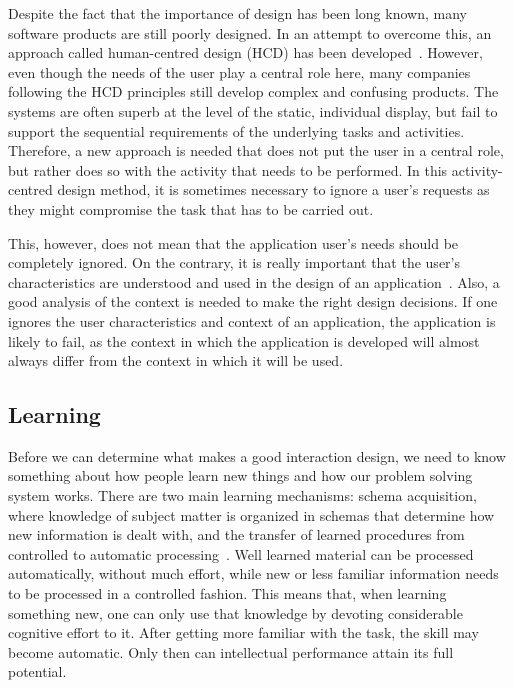Despite the fact that the importance of design has been long known, many software products are still poorly designed. In an attempt to overcome this, an approach called human-centred design (HCD) has been developed~\cite{norman2005human}. However, even though the needs of the user play a central role here, many companies following the HCD principles still develop complex and confusing products. The systems are often superb at the level of the static, individual display, but fail to support the sequential requirements of the underlying tasks and activities. Therefore, a new approach is needed that does not put the user in a central role, but rather does so with the activity that needs to be performed. In this activity-centred design method, it is sometimes necessary to ignore a user's requests as they might compromise the task that has to be carried out.

This, however, does not mean that the application user's needs should be completely ignored. On the contrary, it is really important that the user's characteristics are understood and used in the design of an application~\cite{badre2002shaping}. Also, a good analysis of the context is needed to make the right design decisions. If one ignores the user characteristics and context of an application, the application is  likely to fail, as the context in which the application is developed will almost always differ from the context in which it will be used.

\subsection{Learning}
Before we can determine what makes a good interaction design, we need to know something about how people learn new things and how our problem solving system works. There are two main learning mechanisms: schema acquisition, where knowledge of subject matter is organized in schemas that determine how new information is dealt with, and the transfer of learned procedures from controlled to automatic processing~\cite{sweller1994cognitive}. Well learned material can be processed automatically, without much effort, while new or less familiar information needs to be processed in a controlled fashion. This means that, when learning something new, one can only use that knowledge by devoting considerable cognitive effort to it. After getting more familiar with the task, the skill may become automatic. Only then can intellectual performance attain its full potential.

